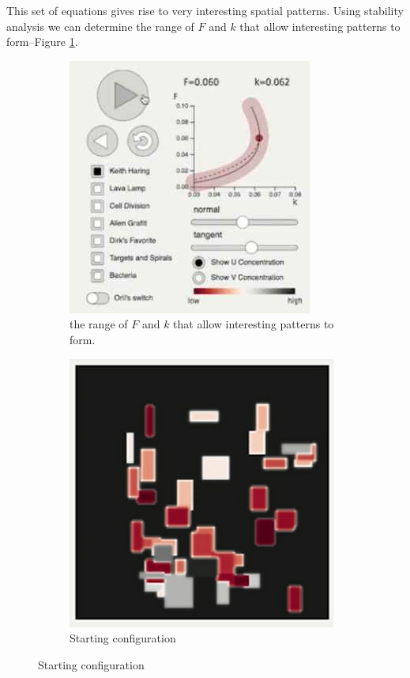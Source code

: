 \documentclass[]{article}
\begin{document}
This set of equations gives rise to very interesting spatial patterns. Using stability analysis we can determine the range of $F$ and $k$ that allow interesting patterns to form--Figure \ref{fig:GreyScottRange}.

\begin{figure}[H]
	\caption{Grey Scott Reaction}
	\begin{subfigure}[b]{0.3\textwidth}
		\centering
		\caption{the range of $F$ and $k$ that allow interesting patterns to form.}\label{fig:GreyScottRange}
		\includegraphics[width=\textwidth]{GreyScottRange}
	\end{subfigure}
	\begin{subfigure}[b]{0.3\textwidth}
		\centering
		\caption{Starting configuration}
		\includegraphics[width=\textwidth]{GreyScottInitial}

\end{subfigure}
\end{figure}
\end{document}
